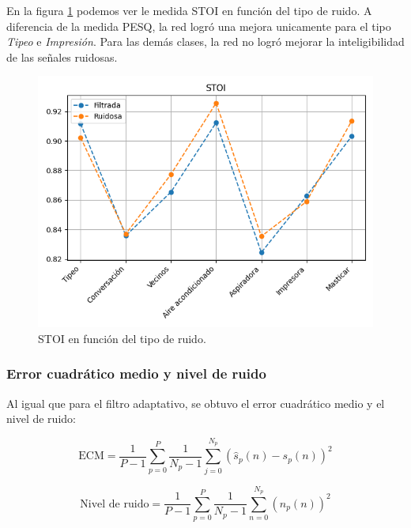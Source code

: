 En la figura \ref{fig:ch7_stoi_by_noise_type} podemos ver le medida STOI en función del tipo de ruido. A diferencia de la medida PESQ, la red logró una mejora unicamente para el tipo \emph{Tipeo} e \emph{Impresión}. Para las demás clases, la red no logró mejorar la inteligibilidad de las señales ruidosas.

\begin{figure}
	\centering
	\centerline{\includegraphics[scale=0.8]{images/ch7/stoi_by_noise_type.png}}
	\caption{STOI en función del tipo de ruido.}
	\label{fig:ch7_stoi_by_noise_type}
\end{figure} 


\subsubsection{Error cuadrático medio y nivel de ruido}

Al igual que para el filtro adaptativo, se obtuvo el error cuadrático medio y el nivel de ruido:

\begin{equation*}
	\text{ECM} = \frac{1}{P-1} \sum_{p=0}^{P} \frac{1}{N_p-1} \sum_{j=0}^{N_p} (\hat{s}_p(n) - s_p(n))^2
\end{equation*}

\begin{equation*}
	\text{Nivel de ruido} = \frac{1}{P-1} \sum_{p=0}^{P} \frac{1}{N_p-1} \sum_{n=0}^{N_p} (n_p(n))^2
\end{equation*}

